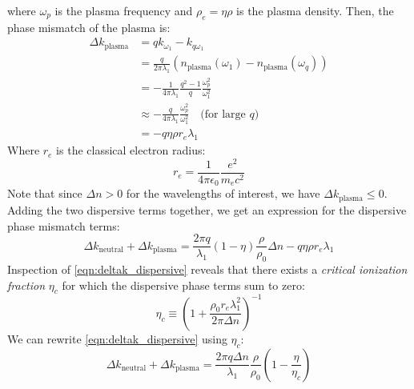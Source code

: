 where $\omega_p$ is the plasma frequency and $\rho_e = \eta \rho$ is the plasma density. Then, the phase mismatch of the plasma is:
\begin{align}
\Delta k_{\textrm{plasma}} &= q k_{\omega_1} - k_{q \omega_1} \nonumber \\
&= \frac{q}{2 \pi \lambda_1} (n_{\textrm{plasma}}(\omega_1) -n_{\textrm{plasma}}(\omega_q) ) \nonumber \\
&= - \frac{1}{4 \pi \lambda_1} \frac{q^2-1}{q} \frac{\omega_p^2}{\omega_1^2} \nonumber \\
&\approx - \frac{q}{4 \pi \lambda_1} \frac{\omega_p^2}{\omega_1^2} \quad \textrm{(for large $q$)} \nonumber \\
&= - q \eta \rho  r_e \lambda_1
\end{align}
Where $r_e$ is the classical electron radius:
\begin{equation}
r_e = \frac{1}{4 \pi \epsilon_0} \frac{e^2}{m_e c^2}
\end{equation}
Note that since $\Delta n > 0$ for the wavelengths of interest, we have $\Delta k_{\textrm{plasma}} \le 0$. Adding the two dispersive terms together, we get an expression for the dispersive phase mismatch terms:
\begin{equation}
\Delta k_{\textrm{neutral}} + \Delta k_{\textrm{plasma}} = \frac{2 \pi q}{\lambda_1} (1-\eta) \frac{\rho}{\rho_0}\Delta n - q \eta \rho  r_e \lambda_1
\label{eqn:deltak_dispersive}
\end{equation}
Inspection of \cref{eqn:deltak_dispersive} reveals that there exists a \textit{critical ionization fraction} $\eta_c$ for which the dispersive phase terms sum to zero:
\begin{equation}
\eta_c \equiv \left( 1+ \frac{\rho_0 r_e \lambda_1^2}{2 \pi \Delta n} \right)^{-1}
\end{equation}
We can rewrite \cref{eqn:deltak_dispersive} using $\eta_c$:
\begin{equation}
\Delta k_{\textrm{neutral}} + \Delta k_{\textrm{plasma}} = \frac{2 \pi q \Delta n}{\lambda_1} \frac{\rho}{\rho_0} \left(1 - \frac{\eta}{\eta_c}\right)
\end{equation}

